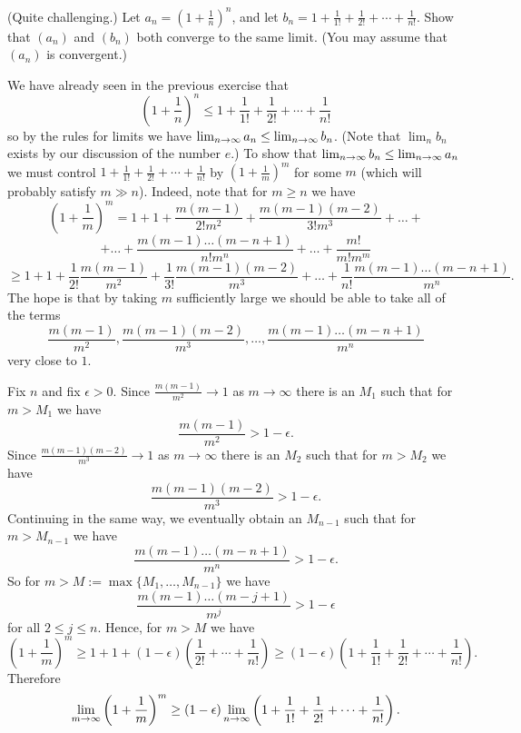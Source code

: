 \documentclass[11pt,dvipsnames]{book}
\numberwithin{equation}{section} %
\numberwithin{figure}{section} %
\numberwithin{table}{section} %
\begin{document}
\begin{exercise}(Quite challenging.) 
Let $a_n = \left(1 + \frac{1}{n}\right)^n$, and let $b_n = 1 + \frac{1}{1!} + \frac{1}{2!} + \cdots + \frac{1}{n!}$. Show that $(a_n)$ and $(b_n)$ both converge to the same limit. (You may assume that $(a_n)$ is convergent.) 

\begin{solution}
We have already seen in the previous exercise that 
\[ \left(1 + \frac{1}{n}\right)^n \leq 1 + \frac{1}{1!} + \frac{1}{2!} + \cdots + \frac{1}{n!}\]
so by the rules for limits we have
$\lim_{n\rightarrow\infty} a_n \leq \lim_{n\rightarrow\infty} b_n$. (Note that $\lim_n b_n$ exists by our discussion of the number $e$.) To show that $\lim_{n\rightarrow\infty} b_n \leq \lim_{n\rightarrow\infty} a_n$ we must control $1 + \frac{1}{1!} + \frac{1}{2!} + \cdots + \frac{1}{n!}$ by $\left(1 + \frac{1}{m}\right)^m$ for some $m$ (which will probably satisfy $m \gg n$). Indeed, note that for $m \geq n$ we have
\[ \left(1 + \frac{1}{m}\right)^m =
1 + 1 + \frac{m(m-1)}{2!m^2} + \frac{m(m-1)(m-2)}{3!m^3} + \dots
+\]
\[+ \dots
+ \frac{m(m-1) \dots (m-n+1)}{n! m^n} + \dots + \frac{m!}{m!m^m}
\]
\[ \geq 1 + 1 + \frac{1}{2!}\frac{m(m-1)}{m^2} + \frac{1}{3!}\frac{m(m-1)(m-2)}{m^3} + \dots
+ \frac{1}{n!}\frac{m(m-1) \dots (m-n+1)}{m^n}.
\]
The hope is that by taking $m$ sufficiently large we should be able to take all of the terms
\[
\frac{m(m-1)}{m^2}, \frac{m(m-1)(m-2)}{m^3}, \dots, \frac{m(m-1) \dots (m-n+1)}{m^n}
\]
very close to $1$.

Fix $n$ and fix $\epsilon>0$. Since 
$\frac{m(m-1)}{m^2} \to 1$ as $m \to \infty$ there is an $M_1$ such that 
for $m > M_1$ we have
\[ \frac{m(m-1)}{m^2} > 1- \epsilon.\]
Since 
$ \frac{m(m-1)(m-2)}{m^3}\to 1$ as $m \to \infty$ there is an $M_2$ such that 
for $m > M_2$ we have
\[ \frac{m(m-1)(m-2)}{m^3} > 1- \epsilon.\]
Continuing in the same way, we eventually obtain an $M_{n-1}$ such that for $m > M_{n-1}$ we have 
\[\frac{m(m-1) \dots (m-n+1)}{m^n} > 1-\epsilon. \]
So for $m > M :=\max\{M_1, \dots, M_{n-1}\}$ we have
\[ \frac{m(m-1) \dots (m-j+1)}{m^j}
>1-\epsilon\]
for all $2\leq j \leq n$. 
Hence, for $m >M$ we have
\[ \left(1 + \frac{1}{m}\right)^m \geq 1 + 1 +(1 - \epsilon)\left(
\frac{1}{2!} + \cdots + \frac{1}{n!}\right) \geq (1 - \epsilon)\left(1 + \frac{1}{1!} +
\frac{1}{2!} + \cdots + \frac{1}{n!}\right).\]
Therefore 
\[ \lim_{m \to \infty} \left(1 + \frac{1}{m}\right)^m \geq (1 - \epsilon) \lim_{n\rightarrow\infty} \left(1 + \frac{1}{1!} +
\frac{1}{2!} + \cdots + \frac{1}{n!} \right).
\]

\end{solution}
\end{exercise}
\end{document}
